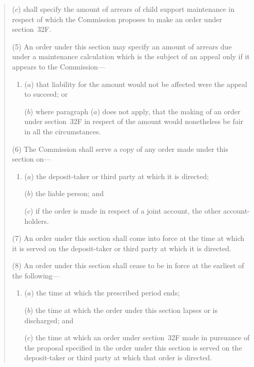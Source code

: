 \documentclass[12pt,a4paper]{article}
\begin{document}
\begin{quotation}
\begin{enumerate}
($c$) shall specify the amount of arrears of child support maintenance in respect of which the Commission proposes to make an order under section~32F.
\end{enumerate}

(5) An order under this section may specify an amount of arrears due under a maintenance calculation which is the subject of an appeal only if it appears to the Commission---
\begin{enumerate}\item[]
($a$) that liability for the amount would not be affected were the appeal to succeed; or

($b$) where paragraph ($a$) does not apply, that the making of an order under section~32F in respect of the amount would nonetheless be fair in all the circumstances.
\end{enumerate}

(6) The Commission shall serve a copy of any order made under this section on---
\begin{enumerate}\item[]
($a$)
the deposit-taker or third party at which it is directed;

($b$)
the liable person; and

($c$)
if the order is made in respect of a joint account, the other account-holders.
\end{enumerate}

(7) An order under this section shall come into force at the time at which it is served on the deposit-taker or third party at which it is directed.

(8) An order under this section shall cease to be in force at the earliest of the following---
\begin{enumerate}\item[]
($a$)
the time at which the prescribed period ends;

($b$)
the time at which the order under this section lapses or is discharged; and

($c$)
the time at which an order under section~32F made in pursuance of the proposal specified in the order under this section is served on the deposit-taker or third party at which that order is directed.
\end{enumerate}

\begin{sloppypar}
\end{sloppypar}


\end{quotation}
\end{document}
